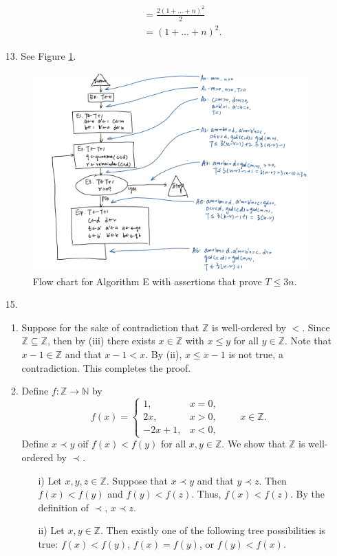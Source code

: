 \documentclass[letterpaper, reqno,11pt]{article}
\newcommand{\ZZ}{\mathbb{Z}}
\newcommand{\NN}{\mathbb{N}}
\begin{document}
\begin{enumerate}
\begin{enumerate}
\begin{align*}
            &= \frac{2(1 + \ldots + n)^2}{2} \\
            &= (1 + \ldots + n)^2.
        \end{align*}
    \end{enumerate}
    \item[13.] See Figure \ref{fig:1.2.1-13}.
    \begin{figure}[h]
        \centering
        \includegraphics[width=\textwidth]{figures/fig_1-2-1_13.png}
        \caption{Flow chart for Algorithm E with assertions that prove $T \leq 3n$.}
        \label{fig:1.2.1-13}
    \end{figure}
    \item[15.]
    \begin{enumerate}
        \item Suppose for the sake of contradiction that $\ZZ$ is well-ordered by $<$. Since $\ZZ \subseteq \ZZ$, then by (iii) there exists $x \in \ZZ$ with $x \leq y$ for all $y \in \ZZ$. Note that $x - 1 \in \ZZ$ and that $x - 1 < x$. By (ii), $x \leq x - 1$ is not true, a contradiction. This completes the proof.
        \item Define $f : \ZZ \to \NN$ by
        $$ f(x) = \left\{
            \begin{array}{ll}
                1, & x = 0, \\
                2x, & x > 0, \\
                -2x + 1, & x < 0,
            \end{array}
        \right. \qquad x \in \ZZ. $$
        Define $x \prec y$ oif $f(x) < f(y)$ for all $x, y \in \ZZ$. We show that $\ZZ$ is well-ordered by $\prec$.
        \begin{enumerate}
            \item[i)] Let $x, y, z \in \ZZ$. Suppose that $x \prec y$ and that $y \prec z$. Then $f(x) < f(y)$ and $f(y) < f(z)$. Thus, $f(x) < f(z)$. By the definition of $\prec$, $x \prec z$.
            \item[ii)] Let $x, y \in \ZZ$. Then existly one of the following tree possibilities is true: $f(x) < f(y)$, $f(x) = f(y)$, or $f(y) < f(x)$.


\end{enumerate}
\end{enumerate}
\end{enumerate}
\end{document}
